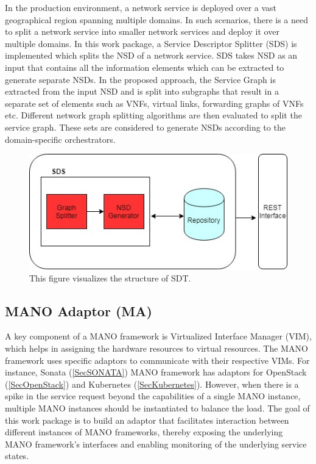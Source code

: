 In the production environment, a network service is deployed over a vast geographical region spanning multiple domains. In such scenarios, there is a need to split a network service into smaller network services and deploy it over multiple domains. In this work package, a Service Descriptor Splitter (SDS) is implemented which splits the NSD of a network service. SDS takes NSD as an input that contains all the information elements which can be extracted to generate separate NSDs. In the proposed approach, the Service Graph is extracted from the input NSD and is split into subgraphs that result in a separate set of elements such as VNFs, virtual links, forwarding graphs of VNFs etc. Different network graph splitting algorithms are then evaluated to split the service graph. These sets are considered to generate NSDs according to the domain-specific orchestrators.

\begin{figure}[h]
	\centering
	\includegraphics[width=0.7\linewidth]{figures/Splitter_Diagram}
	\caption{This figure visualizes the structure of SDT.}
	\label{fig:splitter_Diagram}
\end{figure}

\subsection{MANO Adaptor (MA)}

A key component of a MANO framework is Virtualized Interface Manager (VIM),  which helps in assigning the hardware resources to virtual resources. The MANO framework uses specific adaptors to communicate with their respective VIMs. For instance, Sonata  (\ref{SecSONATA}) MANO framework has adaptors for OpenStack (\ref{SecOpenStack}) and Kubernetes (\ref{SecKubernetes}). However, when there is a spike in the service request beyond the capabilities of a single MANO instance, multiple MANO instances should be instantiated to balance the load. The goal of this work package is to build an adaptor that facilitates interaction between different instances of MANO frameworks, thereby exposing the underlying MANO framework's interfaces and enabling monitoring of the underlying service states.

